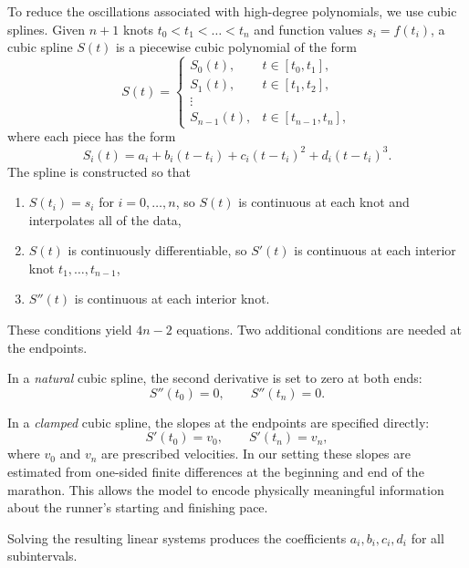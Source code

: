 \documentclass[12pt]{article}
\begin{document}
To reduce the oscillations associated with high-degree polynomials, we
use cubic splines. Given $n+1$ knots $t_0 < t_1 < \dots < t_n$ and function
values $s_i = f(t_i)$, a cubic spline $S(t)$ is a piecewise cubic
polynomial of the form
\begin{equation}
  S(t) =
  \begin{cases}
    S_0(t), & t \in [t_0,t_1], \\
    S_1(t), & t \in [t_1,t_2], \\
    \vdots \\
    S_{n-1}(t), & t \in [t_{n-1},t_n],
  \end{cases}
\end{equation}
where each piece has the form
\begin{equation}
  S_i(t) = a_i + b_i (t - t_i) + c_i (t - t_i)^2 + d_i (t - t_i)^3.
  \label{eq:spline_piece}
\end{equation}
The spline is constructed so that
\begin{enumerate}
  \item $S(t_i) = s_i$ for $i = 0,\dots,n$, so $S(t)$ is continuous at
        each knot and interpolates all of the data,
  \item $S(t)$ is continuously differentiable, so $S'(t)$ is continuous at
        each interior knot $t_1,\dots,t_{n-1}$,
  \item $S''(t)$ is continuous at each interior knot.
\end{enumerate}
These conditions yield $4n-2$ equations. Two additional conditions are
needed at the endpoints.

In a \emph{natural} cubic spline, the second derivative is set to zero
at both ends:
\begin{equation}
  S''(t_0) = 0, \qquad S''(t_n) = 0.
  \label{eq:natural_bc}
\end{equation}

In a \emph{clamped} cubic spline, the slopes at the endpoints are
specified directly:
\begin{equation}
  S'(t_0) = v_0, \qquad S'(t_n) = v_n,
  \label{eq:clamped_bc}
\end{equation}
where $v_0$ and $v_n$ are prescribed velocities. In our setting these
slopes are estimated from one-sided finite differences at the beginning
and end of the marathon. This allows the model to encode physically
meaningful information about the runner's starting and finishing pace.

Solving the resulting linear systems produces the coefficients
$a_i,b_i,c_i,d_i$ for all subintervals.
\end{document}
